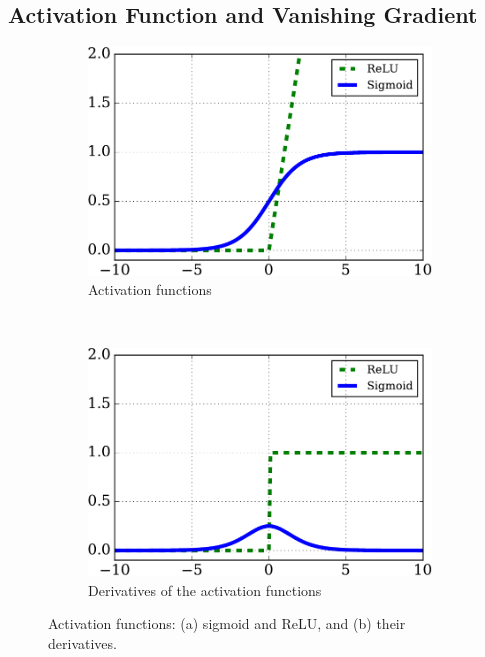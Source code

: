 \subsection{Activation Function and Vanishing Gradient}


\begin{figure}[tbp!]
	\centering
	\begin{subfigure}[t]{0.48\textwidth}
		\includegraphics[width=\textwidth]{pics_snn/af.pdf}
		\caption{Activation functions}
	\end{subfigure}
	~~
	\begin{subfigure}[t]{0.48\textwidth}
		\includegraphics[width=\textwidth]{pics_snn/af_der.pdf}
		\caption{Derivatives of the activation functions}
	\end{subfigure}
	\caption{Activation functions: (a) sigmoid and ReLU, and (b) their derivatives.}
	\label{fig:af}
\end{figure}
